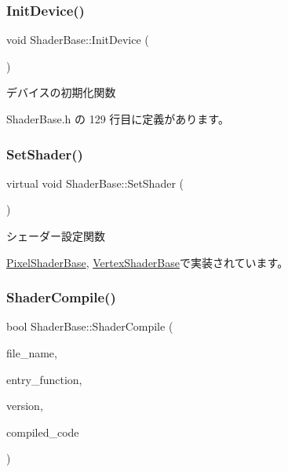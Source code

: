 \subsubsection{\texorpdfstring{Init\+Device()}{InitDevice()}}
{\footnotesize\ttfamily void Shader\+Base\+::\+Init\+Device (\begin{DoxyParamCaption}{ }\end{DoxyParamCaption})\hspace{0.3cm}{\ttfamily [inline]}}



デバイスの初期化関数 



 Shader\+Base.\+h の 129 行目に定義があります。

\mbox{\label{class_shader_base_af45063254b80602db8626360d643baee}} 
\subsubsection{\texorpdfstring{Set\+Shader()}{SetShader()}}
{\footnotesize\ttfamily virtual void Shader\+Base\+::\+Set\+Shader (\begin{DoxyParamCaption}{ }\end{DoxyParamCaption})\hspace{0.3cm}{\ttfamily [pure virtual]}}



シェーダー設定関数 



\mbox{\hyperlink{class_pixel_shader_base_a73f41bda5cbb9309ad415cdc471954a2}{Pixel\+Shader\+Base}}, \mbox{\hyperlink{class_vertex_shader_base_a9f93697c5668852850f0a7b7ef7cb67f}{Vertex\+Shader\+Base}}で実装されています。

\mbox{\label{class_shader_base_ac6e791440374f97592cfb4cb36f4fa55}} 
\subsubsection{\texorpdfstring{Shader\+Compile()}{ShaderCompile()}}
{\footnotesize\ttfamily bool Shader\+Base\+::\+Shader\+Compile (\begin{DoxyParamCaption}\item[{const char $\ast$}]{file\+\_\+name,  }\item[{const char $\ast$}]{entry\+\_\+function,  }\item[{const char $\ast$}]{version,  }\item[{L\+P\+D3\+D\+X\+B\+U\+F\+F\+ER $\ast$}]{compiled\+\_\+code }\end{DoxyParamCaption})\hspace{0.3cm}{\ttfamily [inline]}}



